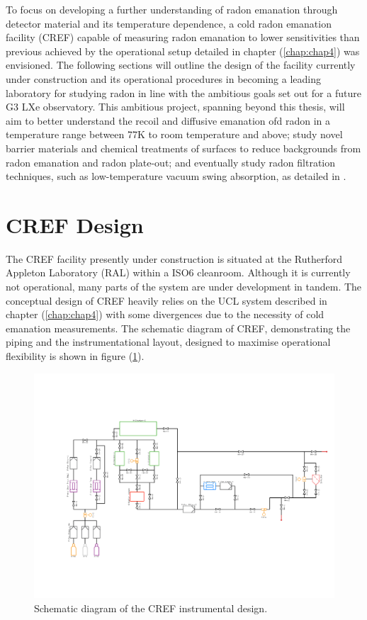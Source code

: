 To focus on developing a further understanding of radon emanation through detector material and its temperature dependence, a cold radon emanation facility (CREF) capable of measuring radon emanation to lower sensitivities than previous achieved by the operational setup detailed in chapter (\ref{chap:chap4}) was envisioned. The following sections will outline the design of the facility currently under construction and its operational procedures in becoming a leading laboratory for studying radon in line with the ambitious goals set out for a future G3 LXe observatory. This ambitious project, spanning beyond this thesis, will aim to better understand the recoil and diffusive emanation ofd radon in a temperature range between 77K to room temperature and above; study novel barrier materials and chemical treatments of surfaces to reduce backgrounds from radon emanation and radon plate-out; and eventually study radon filtration techniques, such as low-temperature vacuum swing absorption, as detailed in \cite{Street:2017bde}. 


\section{CREF Design}
\label{sec:radon_design}

The CREF facility presently under construction is situated at the 
Rutherford Appleton Laboratory (RAL) within a ISO6 cleanroom. Although it is currently not operational, many parts of the system are under development in tandem. The conceptual design of CREF heavily relies on the UCL system described in chapter (\ref{chap:chap4}) with some divergences due to the necessity of cold emanation measurements. The schematic diagram of CREF, demonstrating the piping and the instrumentational layout, designed to maximise operational flexibility is shown in figure (\ref{fig:cref_pid}).
%
\begin{figure}[h!]
    \centering
    \includegraphics[scale=0.5]{Chapter_7/Figures/cold_radon_pid.pdf}
    \caption[Schematic diagram of the CREF instrumental design.]%
    {Schematic diagram of the CREF instrumental design.}
    \label{fig:cref_pid}
\end{figure}
%

